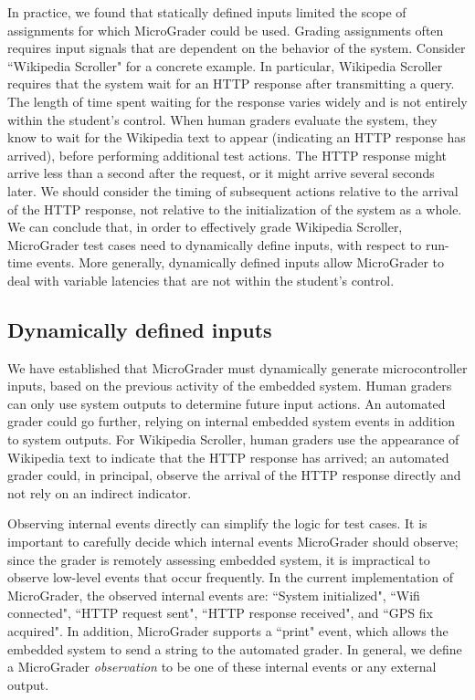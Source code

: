 \documentclass[12pt]{article}
\begin{document}
In practice, we found that statically defined inputs limited the scope of assignments for which MicroGrader could be used.  Grading assignments often requires input signals that are dependent on the behavior of the system.  Consider ``Wikipedia Scroller" for a concrete example.  In particular, Wikipedia Scroller requires that the system wait for an HTTP response after transmitting a query.  The length of time spent waiting for the response varies widely and is not entirely within the student's control.  When human graders evaluate the system, they know to wait for the Wikipedia text to appear (indicating an HTTP response has arrived), before performing additional test actions.  The HTTP response might arrive less than a second after the request, or it might arrive several seconds later.  We should consider the timing of subsequent actions relative to the arrival of the HTTP response, not relative to the initialization of the system as a whole.  We can conclude that, in order to effectively grade Wikipedia Scroller, MicroGrader test cases need to dynamically define inputs, with respect to run-time events.  More generally, dynamically defined inputs allow MicroGrader to deal with variable latencies that are not within the student's control.

\subsection{Dynamically defined inputs}
We have established that MicroGrader must dynamically generate microcontroller inputs, based on the previous activity of the embedded system.  Human graders can only use system outputs to determine future input actions.  An automated grader could go further, relying on internal embedded system events in addition to system outputs.  For Wikipedia Scroller, human graders use the appearance of Wikipedia text to indicate that the HTTP response has arrived; an automated grader could, in principal, observe the arrival of the HTTP response directly and not rely on an indirect indicator.

Observing internal events directly can simplify the logic for test cases.  It is important to carefully decide which internal events MicroGrader should observe; since the grader is remotely assessing embedded system, it is impractical to observe low-level events that occur frequently.  In the current implementation of MicroGrader, the observed internal events are: ``System initialized", ``Wifi connected", ``HTTP request sent", ``HTTP response received", and ``GPS fix acquired".  In addition, MicroGrader supports a ``print" event, which allows the embedded system to send a string to the automated grader.  In general, we define a MicroGrader \textit{observation} to be one of these internal events or any external output.
\end{document}
